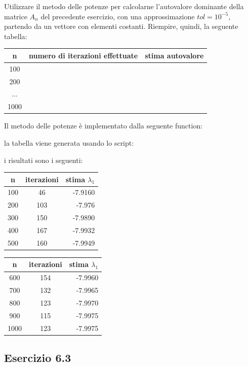 Utilizzare il metodo delle potenze per calcolarne l’autovalore dominante della matrice $A_n$ del precedente esercizio, con una approssimazione $tol = 10^{-5}$, partendo da un vettore con elementi costanti. Riempire, quindi, la seguente
tabella:
\begin{tabular}{|c|c|c|}
\hline
n & numero di iterazioni effettuate & stima autovalore\\
\hline
100 & & \\
200 & & \\
... & & \\
1000 & & \\
\hline
\end{tabular}
\PP
Il metodo delle potenze è implementato dalla seguente function:

la tabella viene generata usando lo script:

i risultati sono i seguenti:\\
\begin{tabular}{|c|c|r|}
	\hline
	n & iterazioni & stima $\lambda_1 $\\
	\hline
     100   &     46   &    -7.9160  \\
     200   &    103   &     -7.976  \\
     300   &    150   &    -7.9890  \\
     400   &    167   &    -7.9932  \\
     500   &    160   &    -7.9949  \\
	\hline
\end{tabular}
\begin{tabular}{|c|c|r|}
	\hline
	n & iterazioni & stima $\lambda_1 $\\
	\hline
     600   &    154   &    -7.9960  \\
     700   &    132   &    -7.9965  \\
     800   &    123   &    -7.9970  \\
     900   &    115   &    -7.9975  \\
    1000   &    123   &    -7.9975  \\
    	\hline
\end{tabular}



	\subsection{Esercizio 6.3}

